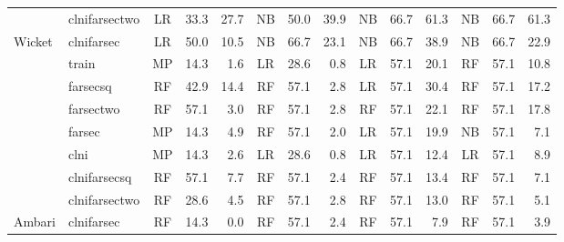 \begin{table*}[!htbp]
\begin{tabular}{l|l|c|r|r|c|r|r|c|r|r|c|r|r}
 & clnifarsectwo & LR & 33.3 & 27.7 & NB & 50.0 & 39.9 & \cellcolor[HTML]{EFEFEF}NB & \cellcolor[HTML]{EFEFEF}66.7 & 61.3 & \cellcolor[HTML]{EFEFEF}NB & \cellcolor[HTML]{EFEFEF}66.7 & 61.3 \\  
\multirow{-8}{*}{Wicket} & clnifarsec & LR & 50.0 & 10.5 & \cellcolor[HTML]{EFEFEF}NB & \cellcolor[HTML]{EFEFEF}66.7 & 23.1 & \cellcolor[HTML]{EFEFEF}NB & \cellcolor[HTML]{EFEFEF}66.7 & 38.9 & \cellcolor[HTML]{EFEFEF}NB & \cellcolor[HTML]{EFEFEF}66.7 & 22.9 \\ \hline
 & train & MP & 14.3 & 1.6 & LR & 28.6 & 0.8 & \cellcolor[HTML]{EFEFEF}LR & \cellcolor[HTML]{EFEFEF}57.1 & 20.1 & \cellcolor[HTML]{EFEFEF}RF & \cellcolor[HTML]{EFEFEF}57.1 & 10.8 \\  
 & farsecsq & RF & 42.9 & 14.4 & \cellcolor[HTML]{EFEFEF}RF & \cellcolor[HTML]{EFEFEF}57.1 & 2.8 & \cellcolor[HTML]{EFEFEF}LR & \cellcolor[HTML]{EFEFEF}57.1 & 30.4 & \cellcolor[HTML]{EFEFEF}RF & \cellcolor[HTML]{EFEFEF}57.1 & 17.2 \\  
 & farsectwo & \cellcolor[HTML]{EFEFEF}RF & \cellcolor[HTML]{EFEFEF}57.1 & 3.0 & \cellcolor[HTML]{EFEFEF}RF & \cellcolor[HTML]{EFEFEF}57.1 & 2.8 & \cellcolor[HTML]{EFEFEF}RF & \cellcolor[HTML]{EFEFEF}57.1 & 22.1 & \cellcolor[HTML]{EFEFEF}RF & \cellcolor[HTML]{EFEFEF}57.1 & 17.8 \\  
 & farsec & MP & 14.3 & 4.9 & \cellcolor[HTML]{EFEFEF}RF & \cellcolor[HTML]{EFEFEF}57.1 & 2.0 & \cellcolor[HTML]{EFEFEF}LR & \cellcolor[HTML]{EFEFEF}57.1 & 19.9 & \cellcolor[HTML]{EFEFEF}NB & \cellcolor[HTML]{EFEFEF}57.1 & 7.1 \\  
 & clni & MP & 14.3 & 2.6 & LR & 28.6 & 0.8 & \cellcolor[HTML]{EFEFEF}LR & \cellcolor[HTML]{EFEFEF}57.1 & 12.4 & \cellcolor[HTML]{EFEFEF}LR & \cellcolor[HTML]{EFEFEF}57.1 & 8.9 \\  
 & clnifarsecsq & \cellcolor[HTML]{EFEFEF}RF & \cellcolor[HTML]{EFEFEF}57.1 & 7.7 & \cellcolor[HTML]{EFEFEF}RF & \cellcolor[HTML]{EFEFEF}57.1 & 2.4 & \cellcolor[HTML]{EFEFEF}RF & \cellcolor[HTML]{EFEFEF}57.1 & 13.4 & \cellcolor[HTML]{EFEFEF}RF & \cellcolor[HTML]{EFEFEF}57.1 & 7.1 \\  
 & clnifarsectwo & RF & 28.6 & 4.5 & \cellcolor[HTML]{EFEFEF}RF & \cellcolor[HTML]{EFEFEF}57.1 & 2.8 & \cellcolor[HTML]{EFEFEF}RF & \cellcolor[HTML]{EFEFEF}57.1 & 13.0 & \cellcolor[HTML]{EFEFEF}RF & \cellcolor[HTML]{EFEFEF}57.1 & 5.1 \\  
\multirow{-8}{*}{Ambari} & clnifarsec & RF & 14.3 & 0.0 & RF & 57.1 & 2.4 & \cellcolor[HTML]{EFEFEF}RF & \cellcolor[HTML]{EFEFEF}57.1 & 7.9 & RF & 57.1 & 3.9 \\ \hline

\end{tabular}
\end{table*}
